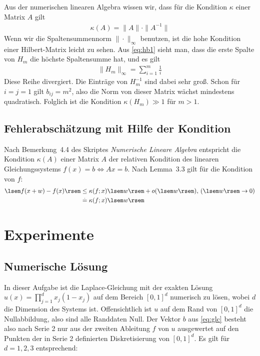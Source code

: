 \documentclass[smallheadings]{scrartcl}
\numberwithin{equation}{section}
\begin{document}
Aus der numerischen linearen Algebra wissen wir, dass für die Kondition $\kappa$ einer Matrix $A$ gilt
\begin{align}
	\kappa(A)=\|A\|\cdot \|A^{-1}\|
\end{align}
Wenn wir die Spaltensummennorm $\|\cdot \|_{\infty}$ benutzen, ist die hohe Kondition einer Hilbert-Matrix leicht zu sehen. Aus \ref{eq:hb1}  sieht man, dass die erste Spalte von $H_m$ die höchste Spaltensumme hat, und es gilt
\begin{align}
	\|H_m\|_{\infty}=\sum_{i=1}^{m}\frac{1}{i}
\end{align}
Diese Reihe divergiert. Die Einträge von $H_m^{-1}$ sind dabei sehr groß. Schon für $i=j=1$ gilt $b_{ij} = m^2$, also die Norm von dieser Matrix wächst mindestens quadratisch. Folglich ist die Kondition $\kappa(H_m)\gg1$ für $m>1$.

\subsection{Fehlerabschätzung mit Hilfe der Kondition}

Nach Bemerkung~4.4 des Skriptes \textit{Numerische Lineare Algebra} entspricht die Kondition $\kappa(A)$ einer Matrix $A$ der relativen Kondition des linearen Gleichungssystems $f(x)=b \iff Ax=b$. Nach Lemma~3.3 gilt für die Kondition von $f$:
\begin{align}
\lsem f(x+w)-f(x)\rsem &\leq \kappa(f;x)\lsem w\rsem + o(\lsem w \rsem)\text{,   } (\lsem w \rsem \rightarrow 0)\\
&\stackrel{.}{=} \kappa(f;x)\lsem w\rsem
\end{align}


\section{Experimente}

\subsection{Numerische Lösung}

In dieser Aufgabe ist die Laplace-Gleichung mit der exakten Lösung $u(x)=\prod_{j=1}^{d}x_j(1-x_j)$ auf dem Bereich $[0, 1]^d$ numerisch zu lösen, wobei $d$ die Dimension des Systems ist. Offensichtlich ist $u$ auf dem Rand von $[0, 1]^d$ die Nullabbildung, also sind alle Randdaten Null. Der Vektor $b$ aus \ref{eq:glc} besteht also nach Serie 2 nur aus der zweiten Ableitung $f$ von $u$ ausgewertet auf den Punkten der in Serie 2 definierten Diskretisierung von $[0, 1]^d$. Es gilt für $d=1, 2, 3$ entsprechend:
\end{document}
